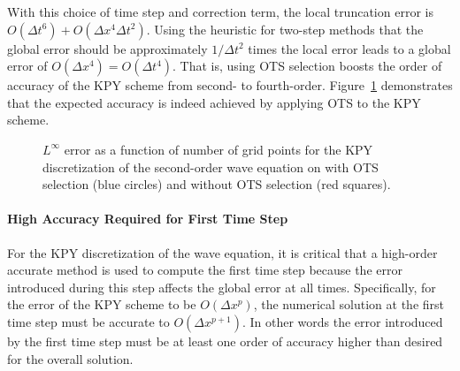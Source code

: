 \documentclass[twocolumn]{article} %
\def\dt{\Delta t}
\def\dx{\Delta x}
\begin{document}
With this choice of time step and correction term, the local truncation
error is $O(\dt^6) + O(\dx^4 \dt^2)$.  Using the heuristic for two-step
methods that the global error should be approximately $1/\dt^2$ times the 
local error leads to a global error of $O(\dx^4) = O(\dt^4)$.  That is, using
OTS selection boosts the order of accuracy of the KPY scheme from second-
to fourth-order.  Figure~\ref{fig:wave_eqn_1d_error} demonstrates that the 
expected accuracy is indeed achieved by applying OTS to the KPY scheme. 

\begin{figure}[thb]
\begin{center}
\caption{$L^\infty$ error as a function of number of grid points for the
KPY discretization of the second-order wave equation on with OTS selection 
(blue circles) and without OTS selection (red squares).
}
\label{fig:wave_eqn_1d_error}
\end{center}
\end{figure}

\paragraph{High Accuracy Required for First Time Step}
For the KPY discretization of the wave equation, it is critical that a 
high-order accurate method is used to compute the first time step because 
the error introduced during this step affects the global error at all times.
Specifically, for the error of the KPY scheme to be $O(\dx^p)$, the numerical
solution at the first time step must be accurate to $O(\dx^{p+1})$.  In other 
words the error introduced by the first time step must be at least one order
of accuracy higher than desired for the overall solution.
\end{document}
